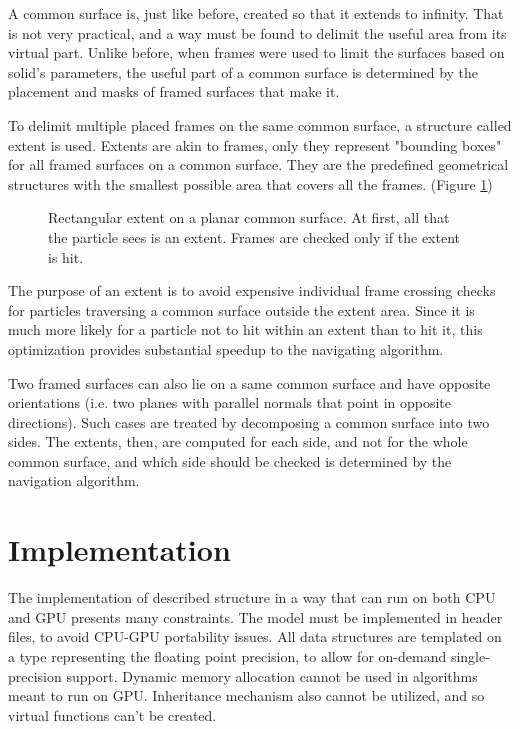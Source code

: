 \documentclass[12pt, a4paper]{article}
\begin{document}
A common surface is, just like before, created so that it extends to infinity. That is not very practical, and a way must be found to delimit the useful area from its virtual part. Unlike before, when frames were used to limit the surfaces based on solid's parameters, the useful part of a common surface is determined by the placement and masks of framed surfaces that make it.

To delimit multiple placed frames on the same common surface, a structure called extent is used. Extents are akin to frames, only they represent "bounding boxes" for all framed surfaces on a common surface. They are the predefined geometrical structures with the smallest possible area that covers all the frames. (Figure \ref{fig:extent})
\begin{figure}[h]
	\centering
	
	\caption{Rectangular extent on a planar common surface. At first, all that the particle sees is an extent. Frames are checked only if the extent is hit.}
	\label{fig:extent}
\end{figure}

The purpose of an extent is to avoid expensive individual frame crossing checks for particles traversing a common surface outside the extent area. Since it is much more likely for a particle not to hit within an extent than to hit it, this optimization provides substantial speedup to the navigating algorithm.

Two framed surfaces can also lie on a same common surface and have opposite orientations (i.e. two planes with parallel normals that point in opposite directions). Such cases are treated by decomposing a common surface into two sides. The extents, then, are computed for each side, and not for the whole common surface, and which side should be checked is determined by the navigation algorithm.


\section{Implementation}

The implementation of described structure in a way that can run on both CPU and GPU presents many constraints. The model must be implemented in header files, to avoid CPU-GPU portability issues. All data structures are templated on a type representing the floating point precision, to allow for on-demand single-precision support. Dynamic memory allocation cannot be used in algorithms meant to run on GPU. Inheritance mechanism also cannot be utilized, and so virtual functions can't be created.
\end{document}
